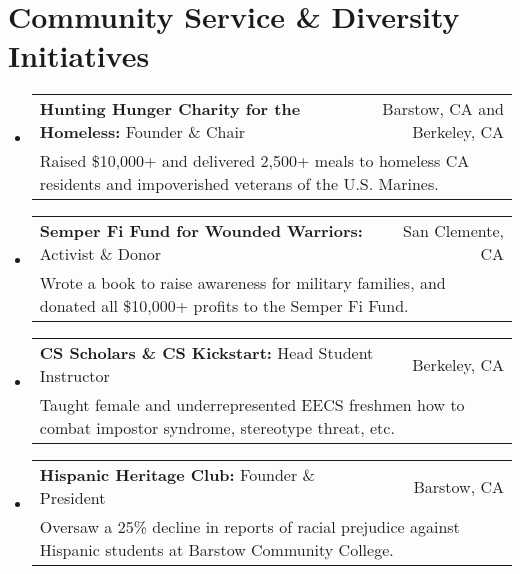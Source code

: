 \documentclass[letterpaper, 11pt]{article}
\makeatletter
\newcommand{\cvSmallItem}[4]{
  \vspace{-1pt}
  \item
  \begin{tabular*}{0.97\textwidth}{l@{\extracolsep{\fill}}r}
    \textbf{#1:} #3 & #2\\
    \multicolumn{2}{l}{\small #4}
  \end{tabular*}
  \vspace{-5pt}
}
\newcommand{\cvItemStart}{\begin{itemize}[leftmargin=*]}
\newcommand{\cvItemEnd}{\end{itemize}}
\makeatother
\begin{document}
\newpage


\section{Community Service \& Diversity Initiatives}

\cvItemStart
\cvSmallItem
{Hunting Hunger Charity for the Homeless}
{Barstow, CA and Berkeley, CA}
{Founder \& Chair}
{Raised \$10,000+ and delivered 2,500+ meals to homeless CA residents and impoverished veterans of the U.S. Marines.}
\cvSmallItem
{Semper Fi Fund for Wounded Warriors}
{San Clemente, CA}
{Activist \& Donor}
{Wrote a book to raise awareness for military families, and donated all \$10,000+ profits to the Semper Fi Fund.}
\cvSmallItem
{CS Scholars \& CS Kickstart}
{Berkeley, CA}
{Head Student Instructor}
{Taught female and underrepresented EECS freshmen how to combat impostor syndrome, stereotype threat, etc.}
\cvSmallItem
{Hispanic Heritage Club}
{Barstow, CA}
{Founder \& President}
{Oversaw a 25\% decline in reports of racial prejudice against Hispanic students at Barstow Community College.}
\cvItemEnd
\end{document}
